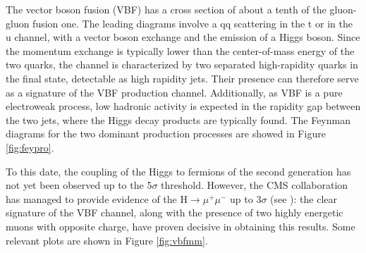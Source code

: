 The vector boson fusion (VBF) has a cross section of about a tenth of the gluon-gluon fusion one. The leading diagrams involve a qq scattering in the t or in the u channel, with a
vector boson exchange and the emission of a Higgs boson. Since the momentum exchange
is typically lower than the center-of-mass energy of the two quarks, the channel is characterized by two separated high-rapidity quarks in the final state, detectable as high rapidity
jets. Their presence can therefore serve as a signature of the VBF production channel. Additionally, as VBF is a pure electroweak process, low hadronic activity is expected in the
rapidity gap between the two jets, where the Higgs decay products are typically found. The Feynman diagrams for the two dominant production processes are showed in Figure \ref{fig:feypro}.

To this date, the coupling of the Higgs to fermions of the second generation has not yet been observed up to the 5$\sigma$ threshold. However, the CMS collaboration has managed to provide evidence of the H$\rightarrow\mu^+\mu^-$ up to 3$\sigma$ (see \cite{Sirunyan_2021}): the clear signature of the VBF channel, along with the presence of two highly energetic muons with opposite charge, have proven decisive in obtaining this results. Some relevant plots are shown in Figure \ref{fig:vbfmm}.

